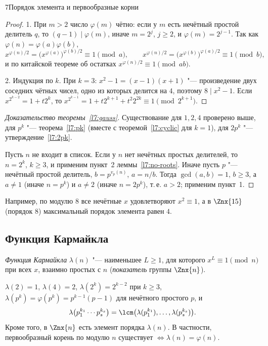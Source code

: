 \begin{lecture}{7}{Порядок элемента и первообразные корни}
\begin{proof}
1. При $m > 2$ число $\varphi(m)$ чётно: если у $m$ есть нечётный простой делитель $q$, то
$(q - 1) \mid \varphi(m)$, иначе $m = 2^j$, $j \ge 2$, и $\varphi(m) = 2^{j-1}$. Так как
$\varphi(n) = \varphi(a)\varphi(b)$,
\[
  x^{\varphi(n)/2} = \bigl(x^{\varphi(a)}\bigr)^{\varphi(b)/2} \equiv 1 \pmod a, \qquad
  x^{\varphi(n)/2} = \bigl(x^{\varphi(b)}\bigr)^{\varphi(a)/2} \equiv 1 \pmod b,
\]
и по китайской теореме об остатках $x^{\varphi(n)/2} \equiv 1 \pmod{ab}$.

2. Индукция по $k$. При $k = 3$: $x^2 - 1 = (x - 1)(x + 1)$ "--- произведение двух соседних
чётных чисел, одно из которых делится на $4$, поэтому $8 \mid x^2 - 1$. Если
$x^{2^{k-2}} = 1 + t 2^k$, то $x^{2^{k-1}} = 1 + t 2^{k+1} + t^2 2^{2k} \equiv 1
\pmod{2^{k+1}}$.
\end{proof}

\begin{proof}[Доказательство теоремы~\ref{l7:gauss}]
Существование для $1, 2, 4$ проверено выше, для $p^k$ "--- теорема~\ref{l7:pk} (вместе с
теоремой~\ref{l7:cyclic} для $k = 1$), для $2p^k$ "--- утверждение~\ref{l7:2pk}.

Пусть $n$ не входит в список. Если у $n$ нет нечётных простых делителей, то $n = 2^k$, $k \ge 3$,
и применим пункт~2 леммы~\ref{l7:no-roots}. Иначе пусть $p$ "--- нечётный простой делитель,
$b = p^{v_p(n)}$, $a = n/b$. Тогда $\gcd(a, b) = 1$, $b \ge 3$, а $a \ne 1$ (иначе
$n = p^k$) и $a \ne 2$ (иначе $n = 2p^k$), т.\,е. $a > 2$; применим пункт~1.
\end{proof}

Например, по модулю $8$ все нечётные $x$ удовлетворяют $x^2 \equiv 1$, а в $\Znx{15}$
(порядок $8$) максимальный порядок элемента равен $4$.


\subsection{Функция Кармайкла}

\begin{definition}
\emph{Функция Кармайкла} $\lambda(n)$ "--- наименьшее $L \ge 1$, для которого $x^L \equiv 1
\pmod n$ при всех $x$, взаимно простых с $n$ (\emph{показатель} группы $\Znx{n}$).
\end{definition}

\begin{theorem}\label{l7:carmichael}
$\lambda(2) = 1$, $\lambda(4) = 2$, $\lambda(2^k) = 2^{k-2}$ при $k \ge 3$,
$\lambda(p^k) = \varphi(p^k) = p^{k-1}(p - 1)$ для нечётного простого $p$, и
\[
  \lambda\bigl(p_1^{k_1} \cdots p_s^{k_s}\bigr) = \lcm\bigl(\lambda(p_1^{k_1}), \dots,
  \lambda(p_s^{k_s})\bigr).
\]
Кроме того, в $\Znx{n}$ есть элемент порядка $\lambda(n)$. В частности, первообразный корень по
модулю $n$ существует $\iff \lambda(n) = \varphi(n)$.
\end{theorem}


\end{lecture}
